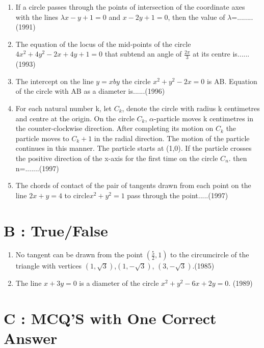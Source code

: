 \documentclass[12pt]{article}
\begin{document}
\begin{enumerate}
\item If a circle passes through the points of intersection of the coordinate axes with the lines $\lambda x-y+1=0$ and $x-2y+1=0$, then the value of $\lambda$=........(1991)
\item The equation of the locus of the mid-points of the circle $4x^2+4y^2-2x+4y+1=0$  that subtend an angle of $\frac{2\pi}{3}$ at its centre is......(1993)
\item The intercept on the line $y=xby$ the circle $x^2+y^2-2x=0$ is AB. Equation of the circle with AB as a diameter is......(1996)
\item For each natural number k, let $C_k$, denote the circle with radius k centimetres and centre at the origin. On the circle $C_k$, $\alpha$-particle moves k centimetres in the counter-clockwise direction. After completing its motion on $C_k$ the particle moves to $C_k+1$ in the radial direction. The motion of the particle continues in this manner. The particle starts at (1,0). If the particle crosses the positive direction of the x-axis for the first time on the circle $C_n$. then n=.......(1997)
\item The chords of contact of the pair of tangents drawn from each point on the line $2x+y=4$ to circle$x^2+y^2=1$ pass through the point.....(1997)


\end{enumerate}

\section*{B    :    True/False}
\begin{enumerate}
\item No tangent can be drawn from the point $(\frac{5}{2}, 1)$ to the circumcircle of the triangle with vertices $(1,\sqrt{3})$,$(1,-\sqrt{3})$, $(3,-\sqrt{3})$.(1985)
\item The line $x+3y=0$ is a diameter of the circle $x^2+y^2-6x+2y=0$. (1989)

\end{enumerate}

\section*{C  :   MCQ'S with One Correct Answer}
\end{document}
